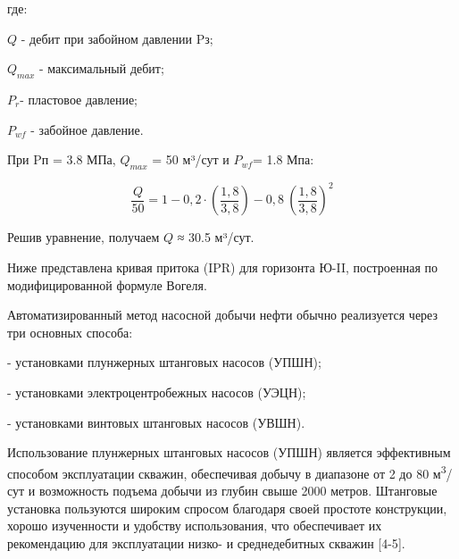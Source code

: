 \begin{multicols}{2}
где:

$Q$ - дебит при забойном давлении Pз;

$Q_{max}$ - максимальный дебит;

$P_r$​ - пластовое давление;

$P_{wf}$ - забойное давление.

При Pп = 3.8 МПа, $Q_{max}$ = 50 м³/сут и $P_{wf}$ ​= 1.8 Мпа:

\[\frac{Q}{50} = 1 - 0,2 \cdot \left( \frac{1,8}{3,8} \right) - 0,8\ \left( \frac{1,8}{3,8} \right)^{2}\]

Решив уравнение, получаем $Q$ ≈ 30.5 м³/сут.

Ниже представлена кривая притока (IPR) для горизонта Ю-II, построенная
по модифицированной формуле Вогеля.

Автоматизированный метод насосной добычи нефти обычно реализуется через
три основных способа:

- установками плунжерных штанговых насосов (УПШН);

- установками электроцентробежных насосов (УЭЦН);

- установками винтовых штанговых насосов (УВШН).

Использование плунжерных штанговых насосов (УПШН) является эффективным
способом эксплуатации скважин, обеспечивая добычу в диапазоне от 2 до 80
м\textsuperscript{3}/сут и возможность подъема добычи из глубин свыше
2000 метров. Штанговые установка пользуются широким спросом благодаря
своей простоте конструкции, хорошо изученности и удобству использования,
что обеспечивает их рекомендацию для эксплуатации низко- и
среднедебитных скважин {[}4-5{]}.
\end{multicols}

